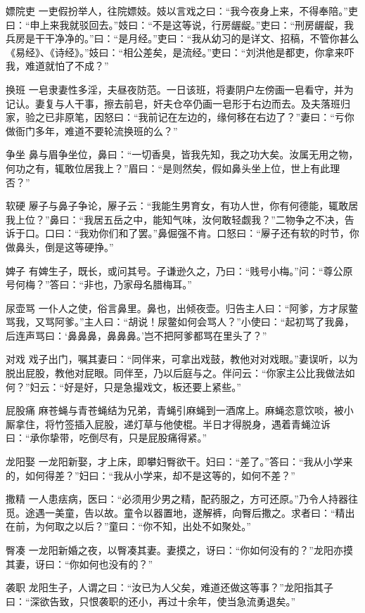 \documentclass[12pt,UTF8]{ctexbook}
\begin{document}
嫖院吏
一吏假扮举人，往院嫖妓。妓以言戏之曰：“我今夜身上来，不得奉陪。”吏曰：“申上来我就驳回去。”妓曰：“不是这等说，行房龌龊。”吏曰：“刑房龌龊，我兵房是干干净净的。”曰：“是月经。”吏曰：“我从幼习的是详文、招稿，不管你甚么《易经》、《诗经》。”妓曰：“相公差矣，是流经。”吏曰：“刘洪他是都吏，你拿来吓我，难道就怕了不成？”

换班
一皂隶妻性多淫，夫昼夜防范。一日该班，将妻阴户左傍画一皂看守，并为记认。妻复与人干事，擦去前皂，奸夫仓卒仍画一皂形于右边而去。及夫落班归家，验之已非原笔，因怒曰：“我前记在左边的，缘何移在右边了？”妻曰：“亏你做衙门多年，难道不要轮流换班的么？”

争坐
鼻与眉争坐位，鼻曰：“一切香臭，皆我先知，我之功大矣。汝属无用之物，何功之有，辄敢位居我上？”眉曰：“是则然矣，假如鼻头坐上位，世上有此理否？”

软硬
屪子与鼻子争论，屪子云：“我能生男育女，有功人世，你有何德能，辄敢居我上位？”鼻曰：“我居五岳之中，能知气味，汝何敢轻觑我？”二物争之不决，告诉于口。口曰：“我劝你们和了罢。”鼻倔强不肯。口怒曰：“屪子还有软的时节，你做鼻头，倒是这等硬挣。”

婢子
有婢生子，既长，或问其号。子谦逊久之，乃曰：“贱号小梅。”问：“尊公原号何梅？”答曰：“非也，乃家母名腊梅耳。”

尿壶骂
一仆人之使，俗言鼻里。鼻也，出倾夜壶。归告主人曰：“阿爹，方才尿鳖骂我，又骂阿爹。”主人曰：“胡说！尿鳖如何会骂人？”小使曰：“起初骂了我鼻，后连声骂曰：‘鼻鼻鼻，鼻鼻鼻。’岂不把阿爹都骂在里头了？”

对戏
戏子出门，嘱其妻曰：“同伴来，可拿出戏鼓，教他对对戏眼。”妻误听，以为脱出屁股，教他对屁眼。同伴至，乃以后庭与之。伴问云：“你家主公比我做法如何？”妇云：“好是好，只是急撮戏文，板还要上紧些。”

屁股痛
麻苍蝇与青苍蝇结为兄弟，青蝇引麻蝇到一酒席上。麻蝇恣意饮啖，被小厮拿住，将竹签插入屁股，递灯草与他使棍。半日才得脱身，遇着青蝇泣诉曰：“承你挚带，吃倒尽有，只是屁股痛得紧。”

龙阳娶
一龙阳新娶，才上床，即攀妇臀欲干。妇曰：“差了。”答曰：“我从小学来的，如何得差？”妇曰：“我从小学来，却不是这等的，如何不差？”

撒精
一人患㾀病，医曰：“必须用少男之精，配药服之，方可还原。”乃令人持器往觅。途遇一美童，告以故。童令以器置地，遂解裤，向臀后撒之。求者曰：“精出在前，为何取之以后？”童曰：“你不知，出处不如聚处。”

臀凑
一龙阳新婚之夜，以臀凑其妻。妻摸之，讶曰：“你如何没有的？”龙阳亦摸其妻，讶曰：“你如何也没有的？”

袭职
龙阳生子，人谓之曰：“汝已为人父矣，难道还做这等事？”龙阳指其子曰：“深欲告致，只恨袭职的还小，再过十余年，使当急流勇退矣。”
\end{document}
